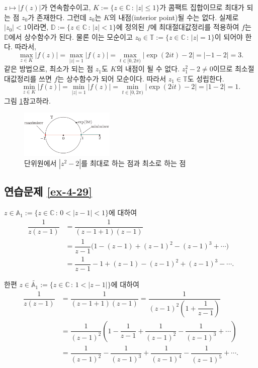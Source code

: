 $z\mapsto |f(z)|$가 연속함수이고, $K:=\{z\in \mathbb C\,:\, |z|\le 1\}$가
콤팩트 집합이므로 최대가 되는 점 $z_0$가 존재한다.
그런데 $z_0$는 $K$의 내점(interior point)될 수는 없다.
실제로 $|z_0|<1$이라면, 
$\mathbb D:=\{z\in \mathbb C\,:\, |z|<1\}$에 정의된 $f$에
최대절대값정리를 적용하여 $f$는 $\mathbb D$에서 상수함수가 된다.
물론 이는 모순이고 $z_0\in \mathbb T:=\{z\in \mathbb C\,:\, |z|= 1\}$이 되어야 한다.
따라서,
\[
\max_{z\in K} |f(z)| = \max_{|z|=1}|f(z)|
= \max_{t\in[0,2\pi)} |\exp(2it)-2| = |-1-2| = 3.
\]
같은 방법으로, 최소가 되는 점 $z_1$도 $K$의 내점이 될 수 없다.
$z_1^2-2\ne 0$이므로 최소절대값정리를 쓰면 $f$는 상수함수가 되어 모순이다.
따라서 $z_1\in\mathbb T$도 성립한다. 
\[
\min_{z\in K} |f(z)| = \min_{|z|=1}|f(z)|
= \min_{t\in[0,2\pi)} |\exp(2it)-2| = |1-2| = 1.
\]
그림 \ref{fig-5-22}\를 참고하라.

\begin{figure}[h!]
\begin{center}
\includegraphics[width=0.4\textwidth]{./Solution/figs/fig-5-22}
\end{center}
\caption{단위원에서 $|z^2-2|$를 최대로 하는 점과 최소로 하는 점
}
\label{fig-5-22}
\end{figure}

\subsection*{연습문제 \ref{ex-4-29}}

$z\in \mathbb A_1 := \{ z\in\mathbb C\,:\, 0<|z-1|<1\}$에 대하여
\begin{align*}
\dfrac1{z(z-1)}
&= \dfrac1{(z-1+1)(z-1)} \\
&= \dfrac1{z-1}\Big(1-(z-1) + (z-1)^2 - (z-1)^3 + \cdots\Big) \\
&= \dfrac1{z-1} - 1 + (z-1) - (z-1)^2 + (z-1)^3 - \cdots.
\end{align*}

한편
$z\in \tilde {\mathbb A_1} := \{ z\in\mathbb C\,:\, 1<|z-1|\}$에 대하여
\begin{align*}
\dfrac1{z(z-1)}
&= \dfrac1{(z-1+1)(z-1)}
= \dfrac1{(z-1)^2\left( 1+ \dfrac1{z-1}\right)} \\
&= \dfrac1{(z-1)^2}\left( 1- \dfrac1{z-1} + \dfrac1{(z-1)^2} - \dfrac1{(z-1)^3} + \cdots \right) \\
&= \dfrac1{(z-1)^2} - \dfrac1{(z-1)^3} + \dfrac1{(z-1)^4} - \dfrac1{(z-1)^5} + \cdots.
\end{align*}

